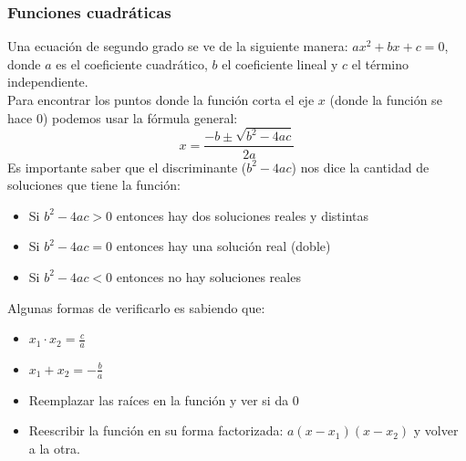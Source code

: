 \documentclass[a4paper]{article}
\begin{document}
\subsubsection{Funciones cuadráticas}
Una ecuación de segundo grado se ve de la siguiente manera: $ax^2+bx+c=0$, donde $a$ es el coeficiente cuadrático, $b$ el coeficiente lineal y $c$ el término independiente.\\
Para encontrar los puntos donde la función corta el eje $x$ (donde la función se hace 0) podemos usar la fórmula general:
\[
    x=\frac{-b \pm \sqrt{b^2-4ac}}{2a}
\]
Es importante saber que el discriminante ($b^2-4ac$) nos dice la cantidad de soluciones que tiene la función:
\begin{itemize}
    \item Si $b^2-4ac>0$ entonces hay dos soluciones reales y distintas
    \item Si $b^2-4ac=0$ entonces hay una solución real (doble)
    \item Si $b^2-4ac<0$ entonces no hay soluciones reales
\end{itemize}
Algunas formas de verificarlo es sabiendo que:
\begin{itemize}
    \item $x_1\cdot x_2=\frac{c}{a}$
    \item $x_1+x_2=-\frac{b}{a}$
    \item Reemplazar las raíces en la función y ver si da 0
    \item Reescribir la función en su forma factorizada: $a(x-x_1)(x-x_2)$ y volver a la otra.
\end{itemize}
\end{document}

